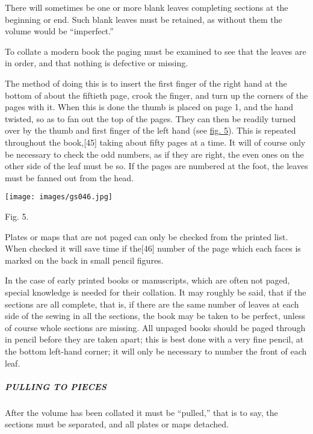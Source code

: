 \documentclass[
]{article}
\begin{document}
There will sometimes be one or more blank leaves completing sections at
the beginning or end. Such blank leaves must be retained, as without
them the volume would be ``imperfect.''

To collate a modern book the paging must be examined to see that the
leaves are in order, and that nothing is defective or missing.

The method of doing this is to insert the first finger of the right hand
at the bottom of about the fiftieth page, crook the finger, and turn up
the corners of the pages with it. When this is done the thumb is placed
on page 1, and the hand twisted, so as to fan out the top of the pages.
They can then be readily turned over by the thumb and first finger of
the left hand (see \protect\hyperlink{Fig_5}{fig. 5}). This is repeated
throughout the book,{\protect\hypertarget{Page_45}{}{{[}45{]}}} taking
about fifty pages at a time. It will of course only be necessary to
check the odd numbers, as if they are right, the even ones on the other
side of the leaf must be so. If the pages are numbered at the foot, the
leaves must be fanned out from the head.

\protect\hypertarget{Fig_5}{}{}
\texttt{[image: images/gs046.jpg]}

Fig. 5.

Plates or maps that are not paged can only be checked from the printed
list. When checked it will save time if
the{\protect\hypertarget{Page_46}{}{{[}46{]}}} number of the page which
each faces is marked on the back in small pencil figures.

In the case of early printed books or manuscripts, which are often not
paged, special knowledge is needed for their collation. It may roughly
be said, that if the sections are all complete, that is, if there are
the same number of leaves at each side of the sewing in all the
sections, the book may be taken to be perfect, unless of course whole
sections are missing. All unpaged books should be paged through in
pencil before they are taken apart; this is best done with a very fine
pencil, at the bottom left-hand corner; it will only be necessary to
number the front of each leaf.

\hypertarget{pulling-to-pieces}{%
\subparagraph{PULLING TO PIECES}\label{pulling-to-pieces}}

After the volume has been collated it must be ``pulled,'' that is to
say, the sections must be separated, and all plates or maps detached.
\end{document}
